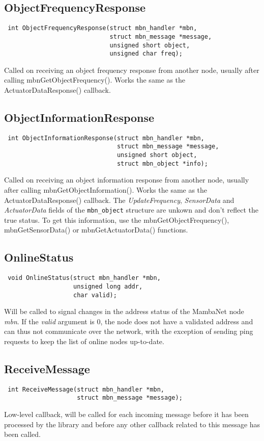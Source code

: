\documentclass[a4paper]{report}
\begin{document}
\subsection{ObjectFrequencyResponse}
\begin{verbatim}
 int ObjectFrequencyResponse(struct mbn_handler *mbn,
                             struct mbn_message *message,
                             unsigned short object,
                             unsigned char freq);
\end{verbatim}
Called on receiving an object frequency response from another node, usually after calling mbnGetObjectFrequency(). Works the same as the ActuatorDataResponse() callback.


\subsection{ObjectInformationResponse}
\begin{verbatim}
 int ObjectInformationResponse(struct mbn_handler *mbn,
                               struct mbn_message *message,
                               unsigned short object,
                               struct mbn_object *info);
\end{verbatim}
Called on receiving an object information response from another node, usually after calling mbnGetObjectInformation(). Works the same as the ActuatorDataResponse() callback. The \textit{UpdateFrequency}, \textit{SensorData} and \textit{ActuatorData} fields of the \verb|mbn_object| structure are unkown and don't reflect the true status. To get this information, use the mbnGetObjectFrequency(), mbnGetSensorData() or mbnGetActuatorData() functions.


\subsection{OnlineStatus}
\begin{verbatim}
 void OnlineStatus(struct mbn_handler *mbn,
                   unsigned long addr,
                   char valid);
\end{verbatim}
Will be called to signal changes in the address status of the MambaNet node \textit{mbn}. If the \textit{valid} argument is 0, the node does not have a validated address and can thus not communicate over the network, with the exception of sending ping requests to keep the list of online nodes up-to-date.


\subsection{ReceiveMessage}
\begin{verbatim}
 int ReceiveMessage(struct mbn_handler *mbn,
                    struct mbn_message *message);
\end{verbatim}
Low-level callback, will be called for each incoming message before it has been processed by the library and before any other callback related to this message has been called.
\end{document}
